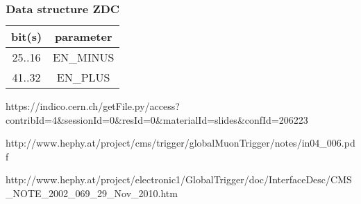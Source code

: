 \documentclass{cmspaper}
\begin{document}
\begin{table}[ht]
\caption{\bf Data structure ZDC}
\vspace{5mm}
\centering
\begin{tabular}{|c|c|}\hline
bit(s) & parameter \\\hline\hline
25..16 & EN\_MINUS \\
41..32 & EN\_PLUS \\\hline
\end{tabular}
\label{table:zdc_struct}
\end{table}

\clearpage

\begin{thebibliography}{00}

 https://indico.cern.ch/getFile.py/access?contribId=4\&sessionId=0\&resId=0\&materialId=slides\&confId=206223

http://www.hephy.at/project/cms/trigger/globalMuonTrigger/notes/in04\_006.pdf

http://www.hephy.at/project/electronic1/GlobalTrigger/doc/InterfaceDesc/CMS\_NOTE\_2002\_069\_29\_Nov\_2010.htm


\end{thebibliography}
\end{document}
